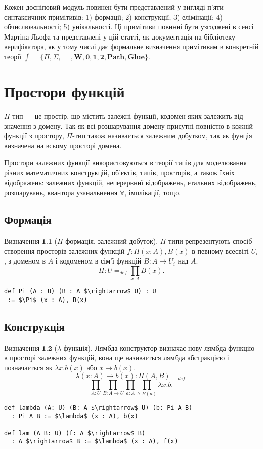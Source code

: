 \documentclass{article}
\theoremstyle{definition}
\begin{document}
Кожен досніповий модуль повинен бути представлений у вигляді п'яти
синтаксичних примітивів: 1) формації; 2) конструкції; 3) елімінації;
4) обчислювальності; 5) унікальності. Ці примітиви повинні бути узгоджені
в сенсі Мартіна-Льофа та представлені у цій статті,
як документація на бібліотеку верифікатора, як у тому числі дає формальне визначення
примітивам в конкретній теорії
$\mathrm{\int} = \{ \Pi, \Sigma, =, \mathbf{W}, \mathbf{0}, \mathbf{1}, \mathbf{2}, \mathbf{Path}, \mathbf{Glue} \}$.

\newpage

\section{Простори функцій}
$\Pi$-тип — це простір, що містить залежні функції, кодомен яких залежить від значення
з домену. Так як всі розшарування домену присутні повністю в кожній функції з простору,
$\Pi$-тип також називається залежним добутком, так як фунція визначена на всьому просторі домена.

Простори залежних функції використовуються в теорії типів для моделювання різних
математичних конструкцій, об'єктів, типів, просторів, а також їхніх відображень:
залежних функцій, неперервниї відображень, етальних відображень, розшарувань, квантора
узанальнення $\forall$, імплікації, тощо.

 \subsection{Формація}

$\textbf{Визначення\ 1.1}$ ($\Pi$-формація, залежний добуток).
$\Pi$-типи репрезентують спосіб створення просторів залежних функцій  $f: \Pi(x:A), B(x)$ в певному всесвіті $U_i$,
з доменом в $A$ і кодоменом в сім'ї функцій $B : A \rightarrow U_i$ над $A$.
$$
   \Pi : U =_{def} \prod_{x:A}B(x).
$$
\begin{lstlisting}[mathescape=true]
def Pi (A : U) (B : A $\rightarrow$ U) : U
 := $\Pi$ (x : A), B(x)
\end{lstlisting}

\subsection{Конструкція}

$\textbf{Визначення\ 1.2}$ ($\lambda$-функція).
Лямбда конструктор визначає нову лямбда функцію в просторі залежних функцій,
вона ще називається лямбда абстракцією і позначається як $\lambda x. b(x)$ або $x \mapsto b(x)$.
$$
    \lambda (x: A) \rightarrow b(x) : \Pi(A,B) =_{def}
$$
$$
    \prod_{A:U}\prod_{B:A \rightarrow U}\prod_{a: A}\prod_{b:B(a)}\lambda x.b.
$$
\begin{lstlisting}[mathescape=true]
def lambda (A: U) (B: A $\rightarrow$ U) (b: Pi A B)
  : Pi A B := $\lambda$ (x : A), b(x)

def lam (A B: U) (f: A $\rightarrow$ B)
  : A $\rightarrow$ B := $\lambda$ (x : A), f(x)
\end{lstlisting}
\end{document}
